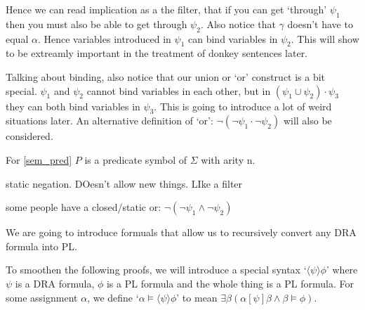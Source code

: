 \documentclass[12pt]{article}
\begin{document}
Hence we can read implication as a the filter, that if you can get `through' $\psi_1$ then you must also be able to get through $\psi_2$. Also notice that $\gamma$ doesn't have to equal $\alpha$. Hence variables introduced in $\psi_1$ can bind variables in $\psi_2$. This will show to be extreamly important in the treatment of donkey sentences later.

Talking about binding, also notice that our union or `or' construct is a bit special. $\psi_1$ and $\psi_2$ cannot bind variables in each other, but in $(\psi_1\cup\psi_2)\cdot\psi_3$ they can both bind variables in $\psi_3$. This is going to introduce a lot of weird situations later. An alternative definition of `or': $\neg(\neg\psi_1\cdot\neg\psi_2)$ will also be considered.

For \eqref{sem_pred} $P$ is a predicate symbol of $\Sigma$ with arity n.

static negation. DOesn't allow new things. LIke a filter

some people have a closed/static or: $\neg(\neg\psi_1\wedge\neg\psi_2)$ \cite{groenendijk1991dynamic}


We are going to introduce formuals that allow us to recursively convert any DRA formula into PL.

To smoothen the following proofs, we will introduce a special syntax `$\langle\psi\rangle\phi$' where $\psi$ is a DRA formula, $\phi$ is a PL formula and the whole thing is a PL formula. For some assignment $\alpha$, we define `$\alpha\models\langle\psi\rangle\phi$' to mean $\exists\beta(\alpha[\psi]\beta \wedge \beta\models\phi)$.
\end{document}
